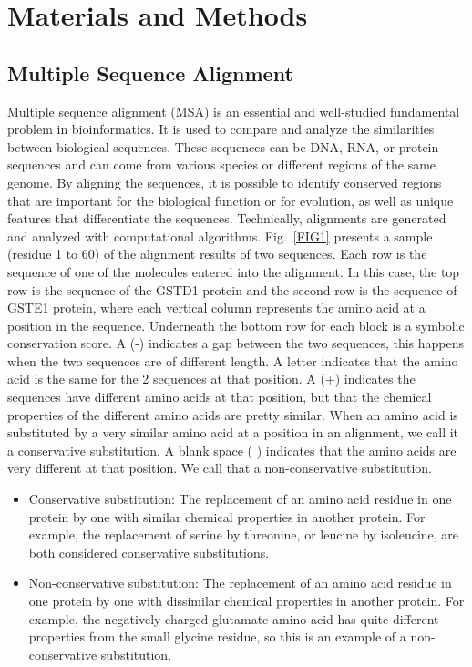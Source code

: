 \chapter{Materials and Methods}
\section{Multiple Sequence Alignment}

Multiple sequence alignment (MSA) is an essential and well-studied fundamental problem in bioinformatics. It is used to compare and analyze the similarities between biological sequences. These sequences can be DNA, RNA, or protein sequences and can come from various species or different regions of the same genome. By aligning the sequences, it is possible to identify conserved regions that are important for the biological function or for evolution, as well as unique features that differentiate the sequences. Technically, alignments are generated and analyzed with computational algorithms. Fig.~\ref{FIG1} presents a sample (residue 1 to 60) of the alignment results of two sequences. Each row is the sequence of one of the molecules entered into the alignment. In this case, the top row is the sequence of the GSTD1 protein and the second row is the sequence of GSTE1 protein, where each vertical column represents the amino acid at a position in the sequence. Underneath the bottom row for each block is a symbolic conservation score. A (-) indicates a gap between the two sequences, this happens when the two sequences are of different length. A letter indicates that the amino acid is the same for the 2 sequences at that position. A (+) indicates the sequences have different amino acids at that position, but that the chemical properties of the different amino acids are pretty similar. When an amino acid is substituted by a very similar amino acid at a position in an alignment, we call it a conservative substitution. A blank space ( ) indicates that the amino acids are very different at that position. We call that a non-conservative substitution.
\begin{itemize}
	\item Conservative substitution: The replacement of an amino acid residue in one protein by one with similar chemical properties in another protein. For example, the replacement of serine by threonine, or leucine by isoleucine, are both considered conservative substitutions.
	\item Non-conservative substitution: The replacement of an amino acid residue in one protein by one with dissimilar chemical properties in another protein. For example, the negatively charged glutamate amino acid has quite different properties from the small glycine residue, so this is an example of a non-conservative substitution.
\end{itemize}


